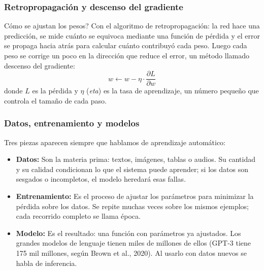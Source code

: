 \subsubsection{Retropropagación y descenso del gradiente}
\textquestiondown Cómo se ajustan los pesos? Con el algoritmo de retropropagación: la red hace una predicción, se mide cuánto se equivoca mediante una función de pérdida y el error se propaga hacia atrás para calcular cuánto contribuyó cada peso. Luego cada peso se corrige un poco en la dirección que reduce el error, un método llamado descenso del gradiente:
\begin{equation}
w \leftarrow w - \eta \cdot \frac{\partial L}{\partial w}
\end{equation}
donde $L$ es la pérdida y $\eta$ (\textit{eta}) es la tasa de aprendizaje, un número pequeño que controla el tamaño de cada paso.

\subsubsection{Datos, entrenamiento y modelos}
Tres piezas aparecen siempre que hablamos de aprendizaje automático:
\begin{itemize}
    \item \textbf{Datos:} Son la materia prima: textos, imágenes, tablas o audios. Su cantidad y su calidad condicionan lo que el sistema puede aprender; si los datos son sesgados o incompletos, el modelo heredará esas fallas.
    \item \textbf{Entrenamiento:} Es el proceso de ajustar los parámetros para minimizar la pérdida sobre los datos. Se repite muchas veces sobre los mismos ejemplos; cada recorrido completo se llama época.
    \item \textbf{Modelo:} Es el resultado: una función con parámetros ya ajustados. Los grandes modelos de lenguaje tienen miles de millones de ellos (GPT-3 tiene 175 mil millones, según Brown et al., 2020). Al usarlo con datos nuevos se habla de inferencia.
\end{itemize}

